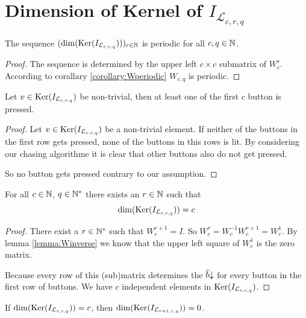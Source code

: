 \section{Dimension of Kernel of $I_{\mathcal{L}_{c,r,q}}$}

\begin{theorem}
	The sequence $(\dim(\operatorname{Ker}(I_{\mathcal{L}_{r,c,q}})))_{r\in\mathbb{N}}$ is
	periodic for all $c,q\in \mathbb{N}$. 	
\end{theorem}

\begin{proof}
	The sequence is determined by the upper left $c \times c$ submatrix of
	$W_{c}^r$. According to corallary \ref{corollary:Wperiodic} $W_{c,q}$ is
	periodic.
\end{proof}

\begin{lemma}
	Let $v\in \operatorname{Ker}(I_{\mathcal{L}_{c,r,q}})$ be non-trivial, then at least
	one of the first $c$ button is pressed.
\end{lemma}

\begin{proof}
	Let $v\in\operatorname{Ker}(I_{\mathcal{L}_{c,r,q}})$ be a non-trivial element. If
	neither of the buttons in the first row gets pressed, none of the
	buttons in this rows is lit. By	considering our chasing algorithme it is
	clear that other buttons also do not get pressed.
	
	So no button gets pressed contrary to our assumption.
\end{proof}

\begin{proposition}\label{proposition:WpowerI}
	For all $c\in\mathbb{N}$, $q\in\mathbb{N}^{*}$ there exists an $r\in\mathbb{N}$ such that
	\[
		\dim(\operatorname{Ker}(I_{\mathcal{L}_{r,c,q}})) = c
	\]
\end{proposition}

\begin{proof}
	There exist a $r\in\mathbb{N}^{*}$ such that $W_{c}^{r+1} = I$. So $W_{c}^{r} =
	W_{c}^{-1}W_{c}^{r+1} = W_{c}^{1}$. By lemma \ref{lemma:Winverse} we
	know that the upper left square of $W_{c}^{1}$ is the zero matrix.
	
	Because every row of this (sub)matrix determines the $\overline{b}\negthickspace\downarrow$
	for every button in the first row of buttons. We have $c$ independent
	elements in $\operatorname{Ker}(I_{\mathcal{L}_{r,c,q}})$.
\end{proof}

\begin{corollary}
	If $\dim(\operatorname{Ker}(I_{\mathcal{L}_{r,c,q}})) = c$, then
	$\dim(\operatorname{Ker}(I_{\mathcal{L}_{r+1,c,q}})) = 0$. 
\end{corollary}

